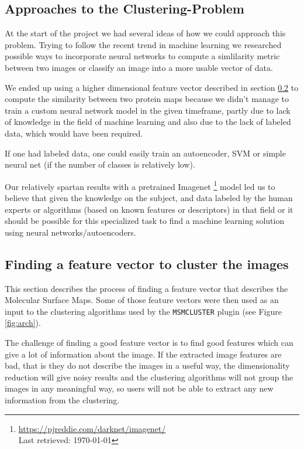 \documentclass[journal]{vgtc}       %
\begin{document}
\subsection{Approaches to the Clustering-Problem}

At the start of the project we had several ideas of how we could approach this problem. 
Trying to follow the recent trend in machine learning we researched possible ways to incorporate neural networks to compute a simlilarity metric between  two images or classify an image into a more usable vector of data.

We ended up using a higher dimensional feature vector described in section \ref{sec:featurev} to  compute the similarity between two protein maps because we didn't manage to train a custom neural network model in the given timeframe, partly due to lack of knowledge in the field of machine learning and also due to the lack of labeled data, which would have been required.

If one had labeled data, one could easily train an autoencoder, SVM or simple neural net (if the number of classes is relatively low).

Our relatively spartan results with a pretrained Imagenet \cite{imagenet}\footnote{\url{https://pjreddie.com/darknet/imagenet/} \\ Last retrieved: \today}  model led us to believe that given the knowledge on the subject, and  data labeled by the human experts or algorithms (based on known features or descriptors) in that field or   it should be possible for this specialized task to find a machine learning  solution using neural networks/autoencoders.



\subsection{Finding a feature vector to cluster the images}\label{sec:featurev}

This section describes the process of finding a feature vector that describes the  Molecular Surface Maps. Some of those feature vectors were then used as an input to the clustering algorithms used by the  \verb|MSMCLUSTER| plugin (see  Figure \ref{fig:arch}).

The challenge of finding a good feature vector is to find good features which can give a lot of information about the image.
If the extracted image features are bad, that is they do not describe the images in a useful way, the dimensionality reduction will give noisy results and the clustering algorithms will not group the images in any meaningful way, so users will not be able to extract any new information from the clustering.
\end{document}
